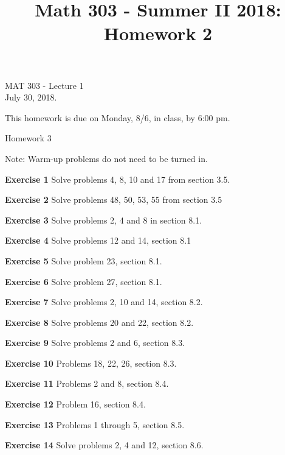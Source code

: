 \documentclass[12pt,oneside]{exam}
\title{Math 303 - Summer II 2018: Homework 2}
\newenvironment{exercise}[1]{\vspace{.1in}\noindent\textbf{Exercise #1 \hspace{.05em}}}{}
\begin{document}
\begin{flushright}
\sc MAT 303 - Lecture 1\\
July 30, 2018.
\end{flushright}
\bigskip

This homework is due on Monday, 8/6, in class, by 6:00 pm. 
\begin{center}
\textsf{Homework 3} 
\end{center}


Note: Warm-up problems do not need to be turned in. 

\begin{exercise}{1}
Solve problems 4, 8, 10 and 17 from section 3.5.
\end{exercise}

\begin{exercise}{2}
Solve problems 48, 50, 53, 55 from section 3.5 
\end{exercise}

\begin{exercise}{3}
Solve problems 2, 4 and 8 in section 8.1. 
\end{exercise}

\begin{exercise}{4} 
Solve problems 12 and 14, section 8.1
\end{exercise}

\begin{exercise}{5}
Solve problem 23, section 8.1.
\end{exercise}

\begin{exercise}{6} 
Solve problem 27, section 8.1. 
\end{exercise}

\begin{exercise}{7}
Solve problems 2, 10 and 14, section 8.2. 
\end{exercise}

\begin{exercise}{8}
Solve problems 20 and 22, section 8.2.
\end{exercise}

\begin{exercise}{9}
Solve problems 2 and 6, section 8.3. 
\end{exercise}

\begin{exercise}{10} 
Problems 18, 22, 26, section 8.3.
\end{exercise}

\begin{exercise}{11}
Problems 2 and 8, section 8.4.  
\end{exercise}

\begin{exercise}{12} 
Problem 16, section 8.4. 
\end{exercise}

\begin{exercise}{13} 
Problems 1 through 5, section 8.5. 
\end{exercise}

\begin{exercise}{14}
Solve problems 2, 4 and 12, section 8.6. 
\end{exercise}
\end{document}
